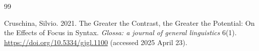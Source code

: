 \documentclass[ruler]{CUP-JNL-LIN}%
\begin{document}
\begin{Backmatter}
\begin{thebibliography}{99}

{Cruschina, Silvio}. 2021. The Greater the Contrast, the Greater the Potential: On the Effects of Focus in Syntax. \textit{Glossa: a journal of general linguistics} 6(1). \url{https://doi.org/10.5334/gjgl.1100} (accessed 2025 April 23).


\end{thebibliography}
\end{Backmatter}
\end{document}
